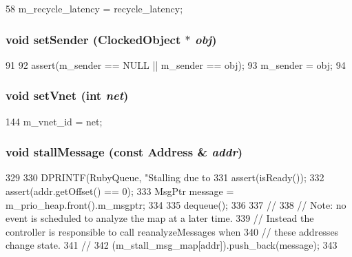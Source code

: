 \begin{DoxyCode}
58     { m_recycle_latency = recycle_latency; }
\end{DoxyCode}
\hypertarget{classMessageBuffer_a0a949993188bb0d51b80b714be944447}{
\subsubsection[{setSender}]{\setlength{\rightskip}{0pt plus 5cm}void setSender ({\bf ClockedObject} $\ast$ {\em obj})}}
\label{classMessageBuffer_a0a949993188bb0d51b80b714be944447}



\begin{DoxyCode}
91     {
92         assert(m_sender == NULL || m_sender == obj);
93         m_sender = obj;
94     }
\end{DoxyCode}
\hypertarget{classMessageBuffer_a528d693acf172c3acd1f7fbf73a463f9}{
\subsubsection[{setVnet}]{\setlength{\rightskip}{0pt plus 5cm}void setVnet (int {\em net})}}
\label{classMessageBuffer_a528d693acf172c3acd1f7fbf73a463f9}



\begin{DoxyCode}
144 { m_vnet_id = net; }
\end{DoxyCode}
\hypertarget{classMessageBuffer_abef10942dc67e1641651a1f9542b7303}{
\subsubsection[{stallMessage}]{\setlength{\rightskip}{0pt plus 5cm}void stallMessage (const {\bf Address} \& {\em addr})}}
\label{classMessageBuffer_abef10942dc67e1641651a1f9542b7303}



\begin{DoxyCode}
329 {
330     DPRINTF(RubyQueue, "Stalling due to %
331     assert(isReady());
332     assert(addr.getOffset() == 0);
333     MsgPtr message = m_prio_heap.front().m_msgptr;
334 
335     dequeue();
336 
337     //
338     // Note: no event is scheduled to analyze the map at a later time.
339     // Instead the controller is responsible to call reanalyzeMessages when
340     // these addresses change state.
341     //
342     (m_stall_msg_map[addr]).push_back(message);
343 }
\end{DoxyCode}


